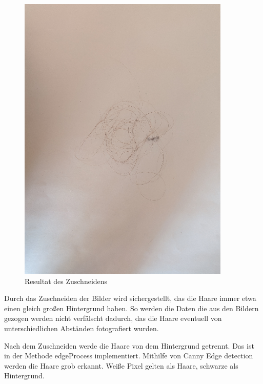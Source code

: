 \documentclass[german,a4paper,12pt]{llncs}
\begin{document}
\begin{figure}
	\centering
	\includegraphics[width=0.9\textwidth]{fig64/03crop image.png}
	\caption[]{Resultat des Zuschneidens}
	\label{img:Crop}
\end{figure}

Durch das Zuschneiden der Bilder wird sichergestellt, das die Haare immer etwa einen gleich großen Hintergrund haben. So werden die Daten die aus den Bildern gezogen werden nicht verfälscht dadurch, das die Haare eventuell von unterschiedlichen Abständen fotografiert wurden. 

Nach dem Zuschneiden werde die Haare von dem Hintergrund getrennt.
Das ist in der Methode edgeProcess implementiert. 
Mithilfe von Canny Edge detection werden die Haare grob erkannt.
Weiße Pixel gelten als Haare, schwarze als Hintergrund.
\end{document}
